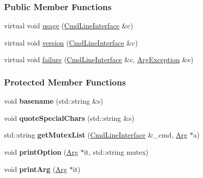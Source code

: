 \subsubsection*{Public Member Functions}
\begin{DoxyCompactItemize}
\item 
virtual void \hyperlink{classTCLAP_1_1ZshCompletionOutput_a3ea685b174fce7ddf2353129863b49d7}{usage} (\hyperlink{classTCLAP_1_1CmdLineInterface}{Cmd\+Line\+Interface} \&c)
\item 
virtual void \hyperlink{classTCLAP_1_1ZshCompletionOutput_a543e705918d769d3d6f4090c403ed0c9}{version} (\hyperlink{classTCLAP_1_1CmdLineInterface}{Cmd\+Line\+Interface} \&c)
\item 
virtual void \hyperlink{classTCLAP_1_1ZshCompletionOutput_abcd0ba63a2ac7675d085877fc4d3e8cf}{failure} (\hyperlink{classTCLAP_1_1CmdLineInterface}{Cmd\+Line\+Interface} \&c, \hyperlink{classTCLAP_1_1ArgException}{Arg\+Exception} \&e)
\end{DoxyCompactItemize}
\subsubsection*{Protected Member Functions}
\begin{DoxyCompactItemize}
\item 
void {\bfseries basename} (std\+::string \&s)\hypertarget{classTCLAP_1_1ZshCompletionOutput_a3fff80665ab8d6161de6451924c2b954}{}\label{classTCLAP_1_1ZshCompletionOutput_a3fff80665ab8d6161de6451924c2b954}

\item 
void {\bfseries quote\+Special\+Chars} (std\+::string \&s)\hypertarget{classTCLAP_1_1ZshCompletionOutput_aacd678921212eb6654d7f704da360361}{}\label{classTCLAP_1_1ZshCompletionOutput_aacd678921212eb6654d7f704da360361}

\item 
std\+::string {\bfseries get\+Mutex\+List} (\hyperlink{classTCLAP_1_1CmdLineInterface}{Cmd\+Line\+Interface} \&\+\_\+cmd, \hyperlink{classTCLAP_1_1Arg}{Arg} $\ast$a)\hypertarget{classTCLAP_1_1ZshCompletionOutput_af3fceb65fc2c22ae8cc3c1df8a503184}{}\label{classTCLAP_1_1ZshCompletionOutput_af3fceb65fc2c22ae8cc3c1df8a503184}

\item 
void {\bfseries print\+Option} (\hyperlink{classTCLAP_1_1Arg}{Arg} $\ast$it, std\+::string mutex)\hypertarget{classTCLAP_1_1ZshCompletionOutput_a33903e3aef02f50799726eb7789fb4d4}{}\label{classTCLAP_1_1ZshCompletionOutput_a33903e3aef02f50799726eb7789fb4d4}

\item 
void {\bfseries print\+Arg} (\hyperlink{classTCLAP_1_1Arg}{Arg} $\ast$it)\hypertarget{classTCLAP_1_1ZshCompletionOutput_a1d079ecf271977419432fb0caa72d035}{}\label{classTCLAP_1_1ZshCompletionOutput_a1d079ecf271977419432fb0caa72d035}

\end{DoxyCompactItemize}
